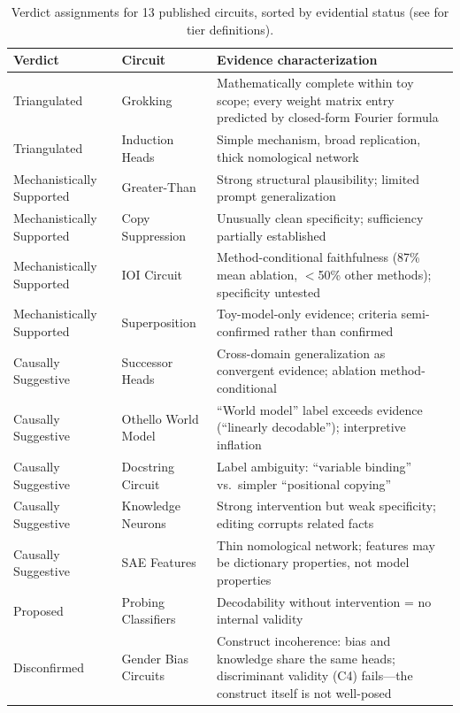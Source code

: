 \documentclass{article}
\begin{document}
\begin{table}[H]
\centering
\small
\caption{Verdict assignments for 13 published circuits, sorted by evidential status (see  for tier definitions).}
\label{tab:case-studies}
\renewcommand{\arraystretch}{1.2}
\begin{tabular}{@{}l>{\raggedright\arraybackslash}p{3cm}>{\raggedright\arraybackslash}p{7cm}@{}}
\toprule
\textbf{Verdict} & \textbf{Circuit} & \textbf{Evidence characterization} \\
\midrule
Triangulated & Grokking \citep{nanda2023progress} & Mathematically complete within toy scope; every weight matrix entry predicted by closed-form Fourier formula \\
\midrule
Triangulated & Induction Heads \citep{olsson2022context} & Simple mechanism, broad replication, thick nomological network \\
\midrule
Mechanistically Supported & Greater-Than \citep{hanna2023greater} & Strong structural plausibility; limited prompt generalization \\
\midrule
Mechanistically Supported & Copy Suppression \citep{mcdougall2023copy} & Unusually clean specificity; sufficiency partially established \\
\midrule
Mechanistically Supported & IOI Circuit \citep{wang2023interpretability} & Method-conditional faithfulness (87\% mean ablation, $<$50\% other methods); specificity untested \\
\midrule
Mechanistically Supported & Superposition \citep{elhage2022superposition} & Toy-model-only evidence; criteria semi-confirmed rather than confirmed \\
\midrule
Causally Suggestive & Successor Heads \citep{gould2023successor} & Cross-domain generalization as convergent evidence; ablation method-conditional \\
\midrule
Causally Suggestive & Othello World Model \citep{li2023othello} & ``World model'' label exceeds evidence (``linearly decodable''); interpretive inflation \\
\midrule
Causally Suggestive & Docstring Circuit \citep{heimersheim2023docstring} & Label ambiguity: ``variable binding'' vs.\ simpler ``positional copying'' \\
\midrule
Causally Suggestive & Knowledge Neurons \citep{dai2022knowledge} & Strong intervention but weak specificity; editing corrupts related facts \\
\midrule
Causally Suggestive & SAE Features \citep{cunningham2023sparse, engels2025not} & Thin nomological network; features may be dictionary properties, not model properties \\
\midrule
Proposed & Probing Classifiers \citep{belinkov2022probing} & Decodability without intervention = no internal validity \\
\midrule
Disconfirmed & Gender Bias Circuits \citep{vig2020gender} & Construct incoherence: bias and knowledge share the same heads; discriminant validity (C4) fails---the construct itself is not well-posed \\
\bottomrule
\end{tabular}
\end{table}
\end{document}
